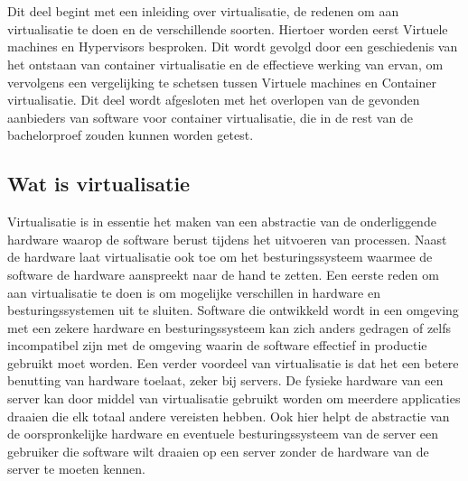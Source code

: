 \chapter{}
\label{ch:stand-van-zaken}
Dit deel begint met een inleiding over virtualisatie, de redenen om aan virtualisatie te doen en de verschillende soorten. Hiertoer worden eerst Virtuele machines en Hypervisors besproken. Dit wordt gevolgd door een geschiedenis van het ontstaan van container virtualisatie en de effectieve werking van ervan, om vervolgens een vergelijking te schetsen tussen Virtuele machines en Container virtualisatie. Dit deel wordt afgesloten met het overlopen van de gevonden aanbieders van software voor container virtualisatie, die in de rest van de bachelorproef zouden kunnen worden getest.


\section{Wat is virtualisatie}

Virtualisatie is in essentie het maken van een abstractie van de onderliggende hardware waarop de software berust tijdens het uitvoeren van processen. Naast de hardware laat virtualisatie ook toe om het besturingssysteem waarmee de software de hardware aanspreekt naar de hand te zetten. Een eerste reden om aan virtualisatie te doen is om mogelijke verschillen in hardware en besturingssystemen uit te sluiten. Software die ontwikkeld wordt in een omgeving met een zekere hardware en besturingssysteem kan zich anders gedragen of zelfs incompatibel zijn met de omgeving waarin de software effectief in productie gebruikt moet worden. Een verder voordeel van virtualisatie is dat het een betere benutting van hardware toelaat, zeker bij servers. De fysieke hardware van een server kan door middel van virtualisatie gebruikt worden om meerdere applicaties draaien die elk totaal andere vereisten hebben. Ook hier helpt de abstractie van de oorspronkelijke hardware en eventuele besturingssysteem van de server een gebruiker die software wilt draaien op een server zonder de hardware van de server te moeten kennen\Autocite{Yadav2018,Jangla2018}.

